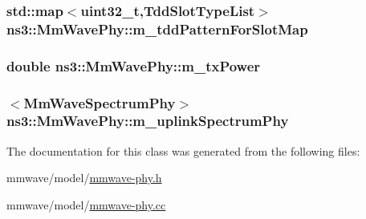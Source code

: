 \subsubsection[{\texorpdfstring{m\+\_\+tdd\+Pattern\+For\+Slot\+Map}{m_tddPatternForSlotMap}}]{\setlength{\rightskip}{0pt plus 5cm}std\+::map$<$uint32\+\_\+t,{\bf Tdd\+Slot\+Type\+List}$>$ ns3\+::\+Mm\+Wave\+Phy\+::m\+\_\+tdd\+Pattern\+For\+Slot\+Map\hspace{0.3cm}{\ttfamily [protected]}}\hypertarget{classns3_1_1MmWavePhy_a5988588aa321367f2df602defe314d28}{}\label{classns3_1_1MmWavePhy_a5988588aa321367f2df602defe314d28}
\subsubsection[{\texorpdfstring{m\+\_\+tx\+Power}{m_txPower}}]{\setlength{\rightskip}{0pt plus 5cm}double ns3\+::\+Mm\+Wave\+Phy\+::m\+\_\+tx\+Power\hspace{0.3cm}{\ttfamily [protected]}}\hypertarget{classns3_1_1MmWavePhy_ab2c43d2201e609a1c159c534e47788c1}{}\label{classns3_1_1MmWavePhy_ab2c43d2201e609a1c159c534e47788c1}
\subsubsection[{\texorpdfstring{m\+\_\+uplink\+Spectrum\+Phy}{m_uplinkSpectrumPhy}}]{$<${\bf Mm\+Wave\+Spectrum\+Phy}$>$ ns3\+::\+Mm\+Wave\+Phy\+::m\+\_\+uplink\+Spectrum\+Phy\hspace{0.3cm}{\ttfamily [protected]}}\hypertarget{classns3_1_1MmWavePhy_a0c65a42f80d7448c933a542342575a36}{}\label{classns3_1_1MmWavePhy_a0c65a42f80d7448c933a542342575a36}


The documentation for this class was generated from the following files\+:\begin{DoxyCompactItemize}
\item 
mmwave/model/\hyperlink{mmwave-phy_8h}{mmwave-\/phy.\+h}\item 
mmwave/model/\hyperlink{mmwave-phy_8cc}{mmwave-\/phy.\+cc}\end{DoxyCompactItemize}
